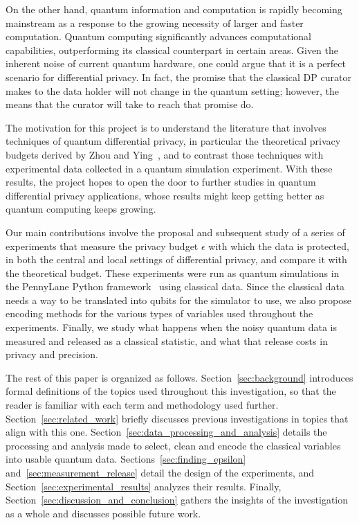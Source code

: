 \documentclass{ieeeaccess}
\begin{document}
On the other hand, quantum information and computation is rapidly becoming mainstream as a response to the growing necessity of larger and faster computation. Quantum computing significantly advances computational capabilities, outperforming its classical counterpart in certain areas. Given the inherent noise of current quantum hardware, one could argue that it is a perfect scenario for differential privacy. In fact, the promise that the classical DP curator makes to the data holder will not change in the quantum setting; however, the means that the curator will take to reach that promise do.

The motivation for this project is to understand the literature that involves techniques of quantum differential privacy, in particular the theoretical privacy budgets derived by Zhou and Ying~\cite{zhou2017differential}, and to contrast those techniques with experimental data collected in a quantum simulation experiment. With these results, the project hopes to open the door to further studies in quantum differential privacy applications, whose results might keep getting better as quantum computing keeps growing.

Our main contributions involve the proposal and subsequent study of a series of experiments that measure the privacy budget $\epsilon$ with which the data is protected, in both the central and local settings of differential privacy, and compare it with the theoretical budget. These experiments were run as quantum simulations in the PennyLane Python framework~\cite{bergholm2018pennylane} using classical data. Since the classical data needs a way to be translated into qubits for the simulator to use, we also propose encoding methods for the various types of variables used throughout the experiments. Finally, we study what happens when the noisy quantum data is measured and released as a classical statistic, and what that release costs in privacy and precision.

The rest of this paper is organized as follows. Section~\ref{sec:background} introduces formal definitions of the topics used throughout this investigation, so that the reader is familiar with each term and methodology used further. Section~\ref{sec:related_work} briefly discusses previous investigations in topics that align with this one. Section~\ref{sec:data_processing_and_analysis} details the processing and analysis made to select, clean and encode the classical variables into usable quantum data. Sections~\ref{sec:finding_epsilon} and~\ref{sec:measurement_release} detail the design of the experiments, and Section~\ref{sec:experimental_results} analyzes their results. Finally, Section~\ref{sec:discussion_and_conclusion} gathers the insights of the investigation as a whole and discusses possible future work.
\end{document}
